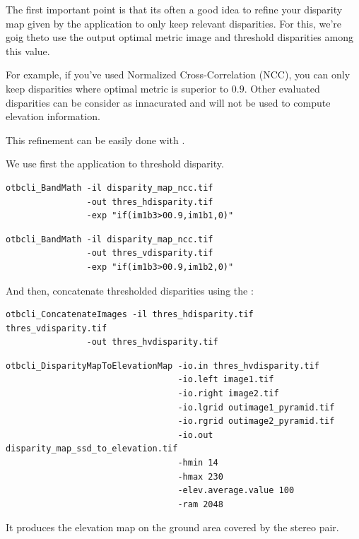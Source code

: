 The first important point is that its often a good idea to refine your disparity
map given by the  application to only keep relevant
disparities. For this, we're goig theto use the output optimal metric image and
threshold disparities among this value.

For example, if you've used Normalized Cross-Correlation (NCC), you can only
keep disparities where optimal metric is superior to $0.9$. Other evaluated
disparities can be consider as innacurated and will not be used to compute
elevation information.

This refinement can be easily done with \app.

We use first the  application to threshold disparity.
\begin{verbatim}
otbcli_BandMath -il disparity_map_ncc.tif
                -out thres_hdisparity.tif
                -exp "if(im1b3>00.9,im1b1,0)"
\end{verbatim}

\begin{verbatim}
otbcli_BandMath -il disparity_map_ncc.tif
                -out thres_vdisparity.tif
                -exp "if(im1b3>00.9,im1b2,0)"
\end{verbatim}

And then, concatenate thresholded disparities using the :

\begin{verbatim}
otbcli_ConcatenateImages -il thres_hdisparity.tif  thres_vdisparity.tif
                -out thres_hvdisparity.tif
\end{verbatim}

\begin{verbatim}
otbcli_DisparityMapToElevationMap -io.in thres_hvdisparity.tif
                                  -io.left image1.tif
                                  -io.right image2.tif
                                  -io.lgrid outimage1_pyramid.tif
                                  -io.rgrid outimage2_pyramid.tif
                                  -io.out disparity_map_ssd_to_elevation.tif
                                  -hmin 14
                                  -hmax 230
                                  -elev.average.value 100
                                  -ram 2048
\end{verbatim}

It produces the elevation map on the ground area covered by the stereo pair.
